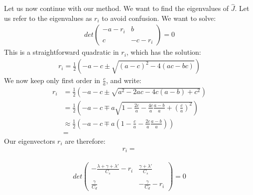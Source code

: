 Let us now continue with our method. We want to find the eigenvalues of $\hat{J}$. Let us refer to the eigenvalues as $r_i$ to avoid confusion. We want to solve:
\begin{align*}
    det\left( \begin{array}{cc}
        -a-r_i & b \\\\
        c & -c-r_i
    \end{array}
    \right)=0
\end{align*}
This is a straightforward quadratic in $r_i$, which has the solution:
\begin{align*}
    r_i=\frac{1}{2}\left( -a-c \pm \sqrt{(a-c)^2-4(ac-bc)} \right)
\end{align*}
We now keep only first order in $\frac{c}{a}$, and write:
\begin{align*}
    r_i&=\frac{1}{2}\left( -a-c \pm \sqrt{a^2-2ac-4c(a-b)+c^2} \right)\\
    &= \frac{1}{2}\left( 
        -a-c \mp a\sqrt{1-\frac{2c}{a}-\frac{4c}{a}\frac{a-b}{a}+\left( \frac{c}{a} \right)^2}
     \right) \\ 
    &\approx \frac{1}{2}\left( 
        -a-c \mp a\left(1-\frac{c}{a}-\frac{2c}{a}\frac{a-b}{a}\right)
     \right) \\ 
    &=
\end{align*}
Our eigenvectors $r_i$ are therefore:
\begin{align*}
    r_i=
\end{align*}


\begin{align*}
    det\left( \begin{array}{cc}
        -\frac{\lambda+\gamma+\lambda'}{C_s}-r_i & \frac{\gamma+\lambda'}{C_s} \\\\
        \frac{\gamma}{C_d} & -\frac{\gamma}{C_d}-r_i
    \end{array}
    \right)=0
\end{align*}


